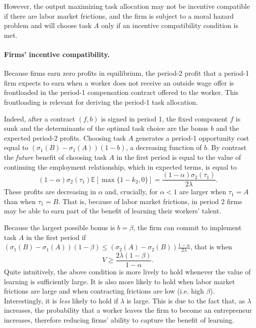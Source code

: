 \documentclass[12pt,american]{paper}
\theoremstyle{remark}
\begin{document}
However, the output maximizing task allocation may not be incentive compatible if there are labor market frictions, and the firm is subject to a moral hazard problem and will choose task $A$ only if an incentive compatibility condition is met.

\paragraph{Firms' incentive compatibility.} Because firms earn zero profits in equilibrium, the period-2 profit that a period-1 firm expects to earn when a worker does not receive an outside wage offer is frontloaded in the period-1 compensation contract offered to the  worker. This frontloading is relevant for deriving the period-1 task allocation. 

Indeed, after a contract $(f,b)$  is signed in period 1, the fixed component $f$ is sunk and the determinants of the optimal task choice are the bonus $b$ and the expected period-2 profits. Choosing task $A$ generates a period-1 opportunity cost equal to $( \sigma_1(B)- \sigma_1(A))(1-b)$, a decreasing function of $b$. By contrast the \textit{future} benefit of choosing task $A$ in the first period is equal to the value of continuing the employment relationship, which in expected terms, is equal to 
\[(1- \alpha) \sigma_2(\tau_1) \mathbb E[\max \{1-k_2,0\}]=\frac{(1-\alpha) \sigma_2(\tau_1)}{2\lambda}.\]
These profits are decreasing in $\alpha$ and, crucially, for $\alpha<1$ are larger when $\tau_1=A$ than when $\tau_1=B$. That is, because of labor market frictions, in period 2 firms may be able to earn part of the benefit of learning their workers' talent. 

Because the largest possible bonus  is $b=\beta$,  the firm can commit to implement task $A$ in the first period if $( \sigma_1(B)- \sigma_1(A))(1-\beta) \leq(\sigma_2(A)-\sigma_2(B))\frac{1-\alpha}{2\lambda} $, that is when
%
\begin{equation}\label{eq: commitment}
V \geq \frac{2 \lambda (1-\beta)}{1-\alpha}.
\end{equation}
Quite intuitively, the above condition is more lively to hold whenever the value of learning is sufficiently large. It is also more likely to hold when labor market frictions are large and when contracting frictions are low (i.e. high $\beta$). Interestingly, it is \textit{less} likely to hold if $\lambda$ is large. This is due to the fact that, as $\lambda$ increases, the probability that a worker leaves the firm to become an entrepreneur increases, therefore reducing  firms' ability to capture the benefit of learning.
\end{document}
